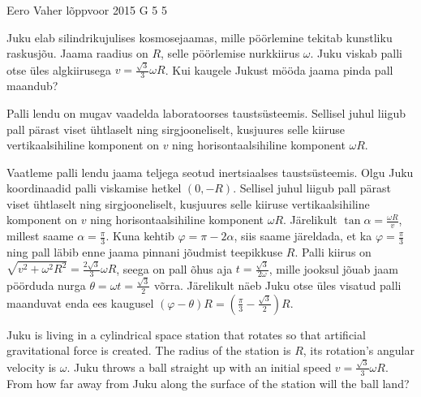 {Eero Vaher} %
{lõppvoor} %
{2015} %
{G 5} %
{5} %
{
\ifStatement
Juku elab silindrikujulises kosmosejaamas, mille pöörlemine tekitab kunstliku raskusjõu. Jaama raadius on $R$, selle pöörlemise nurkkiirus $\omega$. Juku viskab palli otse üles algkiirusega $v=\frac{\sqrt{3}}{3}\omega R$. Kui kaugele Jukust mööda jaama pinda pall maandub?
\fi


\ifHint
Palli lendu on mugav vaadelda laboratoorses taustsüsteemis. Sellisel juhul liigub pall pärast viset ühtlaselt ning sirgjooneliselt, kusjuures selle kiiruse vertikaalsihiline komponent on $v$ ning horisontaalsihiline komponent $\omega R$.
\fi


\ifSolution
Vaatleme palli lendu jaama teljega seotud inertsiaalses taustsüsteemis. Olgu Juku koordinaadid palli viskamise hetkel $(0,-R)$. Sellisel juhul liigub pall pärast viset ühtlaselt ning sirgjooneliselt, kusjuures selle kiiruse vertikaalsihiline komponent on $v$ ning horisontaalsihiline komponent $\omega R$. Järelikult $\tan\alpha=\frac{\omega R}{v}$, millest saame $\alpha=\frac{\pi}{3}$. Kuna kehtib $\varphi=\pi-2\alpha$, siis saame järeldada, et ka $\varphi=\frac{\pi}{3}$ ning pall läbib enne jaama pinnani jõudmist teepikkuse $R$. Palli kiirus on $\sqrt{v^2+\omega^2R^2}=\frac{2\sqrt{3}}{3}\omega R$, seega on pall õhus aja $t=\frac{\sqrt{3}}{2\omega}$, mille jooksul jõuab jaam pöörduda nurga $\theta=\omega t=\frac{\sqrt{3}}{2}$ võrra. Järelikult näeb Juku otse üles visatud palli maanduvat enda ees kaugusel $\left(\varphi-\theta\right)R=\left(\frac{\pi}{3}-\frac{\sqrt{3}}{2}\right)R$.

\begin{center}
\end{center}
\fi


\ifEngStatement
Juku is living in a cylindrical space station that rotates so that artificial gravitational force is created. The radius of the station is $R$, its rotation’s angular velocity is $\omega$. Juku throws a ball straight up with an initial speed $v=\frac{\sqrt{3}}{3}\omega R$. From how far away from Juku along the surface of the station will the ball land?
\fi


}
